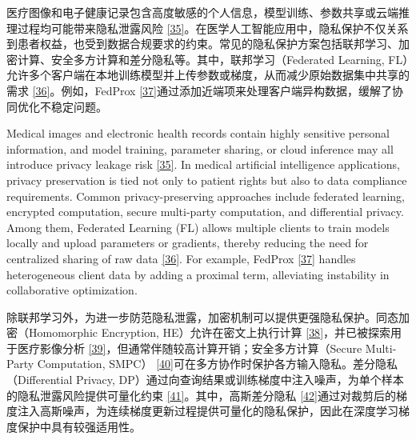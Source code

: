 \label{c.ux9690ux79c1ux4fddux62a4}


医疗图像和电子健康记录包含高度敏感的个人信息，模型训练、参数共享或云端推理过程均可能带来隐私泄露风险 \hyperref[_Ref213950358]{{[}35{]}}。在医学人工智能应用中，隐私保护不仅关系到患者权益，也受到数据合规要求的约束。常见的隐私保护方案包括联邦学习、加密计算、安全多方计算和差分隐私等。其中，联邦学习（Federated Learning, FL）允许多个客户端在本地训练模型并上传参数或梯度，从而减少原始数据集中共享的需求 \hyperref[_Ref213950376]{{[}36{]}}。例如，FedProx \hyperref[_Ref213950391]{{[}37{]}}通过添加近端项来处理客户端异构数据，缓解了协同优化不稳定问题。

Medical images and electronic health records contain highly sensitive personal information, and model training, parameter sharing, or cloud inference may all introduce privacy leakage risk \hyperref[_Ref213950358]{{[}35{]}}. In medical artificial intelligence applications, privacy preservation is tied not only to patient rights but also to data compliance requirements. Common privacy-preserving approaches include federated learning, encrypted computation, secure multi-party computation, and differential privacy. Among them, Federated Learning (FL) allows multiple clients to train models locally and upload parameters or gradients, thereby reducing the need for centralized sharing of raw data \hyperref[_Ref213950376]{{[}36{]}}. For example, FedProx \hyperref[_Ref213950391]{{[}37{]}} handles heterogeneous client data by adding a proximal term, alleviating instability in collaborative optimization.

除联邦学习外，为进一步防范隐私泄露，加密机制可以提供更强隐私保护。同态加密（Homomorphic Encryption, HE）允许在密文上执行计算 \hyperref[_Ref213950427]{{[}38{]}}，并已被探索用于医疗影像分析 \hyperref[_Ref213950433]{{[}39{]}}，但通常伴随较高计算开销；安全多方计算（Secure Multi-Party Computation, SMPC） \hyperref[_Ref213950438]{{[}40{]}}可在多方协作时保护各方输入隐私。差分隐私（Differential Privacy, DP）通过向查询结果或训练梯度中注入噪声，为单个样本的隐私泄露风险提供可量化约束 \hyperref[_Ref213950443]{{[}41{]}}。其中，高斯差分隐私 \hyperref[_Ref213950449]{{[}42{]}}通过对裁剪后的梯度注入高斯噪声，为连续梯度更新过程提供可量化的隐私保护，因此在深度学习梯度保护中具有较强适用性。

